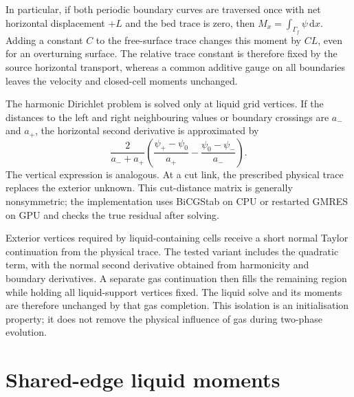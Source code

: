 \documentclass[10pt]{article}
\newcommand{\dd}{\,\mathrm{d}}
\begin{document}
In particular, if both periodic boundary curves are traversed once with
net horizontal displacement $+L$ and the bed trace is zero, then
$M_x=\int_{\Gamma_f}\psi\dd x$. Adding a constant $C$ to the free-surface
trace changes this moment by $CL$, even for an overturning surface.
The relative trace constant is therefore fixed by the source horizontal
transport, whereas a common additive gauge on all boundaries leaves the
velocity and closed-cell moments unchanged.

The harmonic Dirichlet problem is solved only at liquid grid vertices. If the
distances to the left and right neighbouring values or boundary crossings are
$a_-$ and $a_+$, the horizontal second derivative is approximated by
\begin{equation}
 \frac{2}{a_-+a_+}
 \left(\frac{\psi_+-\psi_0}{a_+}
       -\frac{\psi_0-\psi_-}{a_-}\right).
 \label{eq:sw}
\end{equation}
The vertical expression is analogous. At a cut link, the prescribed
physical trace replaces the exterior unknown. This cut-distance matrix is
generally nonsymmetric; the implementation uses BiCGStab on CPU or restarted
GMRES on GPU and checks the true residual after solving.

Exterior vertices required by liquid-containing cells receive a short normal
Taylor continuation from the physical trace. The tested variant includes
the quadratic term, with the normal second derivative obtained from
harmonicity and boundary derivatives. A separate gas continuation then fills
the remaining region while holding all liquid-support vertices fixed. The
liquid solve and its moments are therefore unchanged by that gas completion.
This isolation is an initialisation property; it does not remove the physical
influence of gas during two-phase evolution.

\section{Shared-edge liquid moments}
\end{document}
